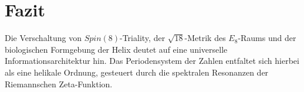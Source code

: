 \documentclass[11pt,a4paper]{article}
\newcommand{\SpinEight}{Spin(8)}
\begin{document}
	
	
	\section{Fazit}
	Die Verschaltung von $\SpinEight$-Triality, der $\sqrt{18}$-Metrik des $E_8$-Raums und der biologischen Formgebung der Helix deutet auf eine universelle Informationsarchitektur hin. Das Periodensystem der Zahlen entfaltet sich hierbei als eine helikale Ordnung, gesteuert durch die spektralen Resonanzen der Riemannschen Zeta-Funktion.
	
\end{document}
